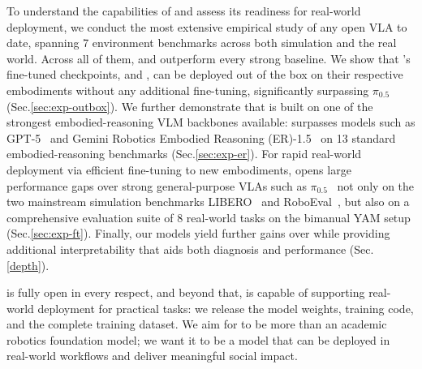 To understand the capabilities of \molmoactt and assess its readiness for real-world deployment, we conduct the most extensive empirical study of any open VLA to date, spanning 7 environment benchmarks across both simulation and the real world. Across all of them, \molmoactt and \molmothink outperform every strong baseline. We show that \molmoactt's fine-tuned checkpoints, \molmoacttdroid and \molmoacttso, can be deployed out of the box on their respective embodiments without any additional fine-tuning, significantly surpassing $\pi_{0.5}$~\citep{intelligence2025pi05visionlanguageactionmodelopenworld} (Sec.\ref{sec:exp-outbox}). We further demonstrate that \molmoactt is built on one of the strongest embodied-reasoning VLM backbones available: \molmoer surpasses models such as GPT-5~\citep{singh2025openai} and Gemini Robotics Embodied Reasoning (ER)-1.5~\citep{team2025gemini15} on 13 standard embodied-reasoning benchmarks (Sec.\ref{sec:exp-er}). For rapid real-world deployment via efficient fine-tuning to new embodiments, \molmoactt opens large performance gaps over strong general-purpose VLAs such as $\pi_{0.5}$~\citep{intelligence2025pi05visionlanguageactionmodelopenworld} not only on the two mainstream simulation benchmarks LIBERO~\citep{liu2023libero} and RoboEval~\citep{wang2025roboeval}, but also on a comprehensive evaluation suite of 8 real-world tasks on the bimanual YAM setup (Sec.\ref{sec:exp-ft}). Finally, our \molmothink models yield further gains over \molmoactt while providing additional interpretability that aids both diagnosis and performance (Sec.\ref{depth}).

\molmoactt is fully open in every respect, and beyond that, is capable of supporting real-world deployment for practical tasks: we release the model weights, training code, and the complete training dataset. We aim for \molmoactt to be more than an academic robotics foundation model; we want it to be a model that can be deployed in real-world workflows and deliver meaningful social impact.
